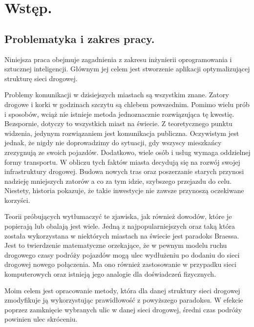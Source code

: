 \documentclass[twoside,12pt]{report}
\let\oldsection\chapter
\def\chapter{\cleardoublepage\oldsection}
\begin{document}


\tableofcontents	%

\chapter{Wstęp.} \label{rozdz.wstep} 

\section{Problematyka i zakres pracy.}

Niniejsza praca obejmuje zagadnienia z zakresu inżynierii oprogramowania i sztucznej inteligencji. Głównym jej celem jest stworzenie aplikacji optymalizującej strukturę sieci drogowej.

Problemy komunikacji w dzisiejszych miastach są wszystkim znane. Zatory drogowe i korki w godzinach szczytu są chlebem powszednim. Pomimo wielu prób i sposobów, wciąż nie istnieje metoda jednoznacznie rozwiązująca tę kwestię. Bezspornie, dotyczy to wszystkich miast na świecie. Z teoretycznego punktu widzenia, jedynym rozwiązaniem jest komunikacja publiczna. Oczywistym jest jednak, że nigdy nie doprowadzimy do sytuacji, gdy wszyscy mieszkańcy zrezygnują ze swoich pojazdów. Dodatkowo, wiele osób i usług wymaga oddzielnej formy transportu. W obliczu tych faktów miasta decydują się na rozwój swojej infrastruktury drogowej. Budowa nowych tras oraz poszerzanie starych przynosi nadzieję mniejszych zatorów a co za tym idzie, szybszego przejazdu do celu. Niestety, historia pokazuje, że takie inwestycje nie zawsze przynoszą oczekiwane korzyści.

Teorii próbujących wytłumaczyć te zjawiska, jak również dowodów, które je popierają lub obalają jest wiele. Jedną z najpopularniejszych oraz taką która została wykorzystana w niektórych miastach na świecie jest paradoks Braessa\cite{braess}. Jest to twierdzenie matematyczne orzekające, że w pewnym modelu ruchu drogowego czasy podróży pojazdów mogą ulec wydłużeniu po dodaniu do sieci drogowej nowego połączenia. Ma ono również  zastosowanie w przypadku  sieci komputerowych oraz istnieją jego analogie dla doświadczeń fizycznych.

Moim celem jest opracowanie metody, która dla danej struktury sieci drogowej zmodyfikuje ją wykorzystując prawidłowość z powyższego paradoksu. W efekcie poprzez zamknięcie wybranych ulic w danej sieci drogowej, średni czas podróży powinien ulec skróceniu.
\end{document}
